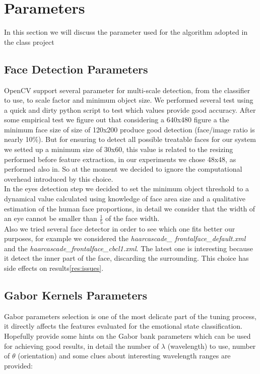 \section{Parameters}

In this section we will discuss the parameter used for the algorithm adopted in the class project

\subsection{Face Detection Parameters}

OpenCV support several parameter for multi-scale detection, from the classifier to use, to scale factor and minimum object size. We performed several test using a quick and dirty python script to test which values provide good accuracy. After some empirical test we figure out that considering a 640x480 figure a the minimum face size of size of 120x200 produce good detection (face/image ratio is nearly 10\%). But for ensuring to detect all possible treatable faces for our system we setted up a minimum size of 30x60, this value is related to the resizing performed before feature extraction, in our experiments we chose 48x48, as performed also in\cite{Littlewort04dynamicsof}. So at the moment we decided to ignore the computational overhead introduced by this choice. \\

In the eyes detection step we decided to set the minimum object threshold to a dynamical value calculated using knowledge of face area size and a qualitative estimation of the human face proportions, in detail we consider that the width of an eye cannot be smaller than $\frac{1}{5}$ of the face width.\\

Also we tried several face detector in order to see which one fits better our purposes, for example we considered the \emph{haarcascade\_ frontalface\_default.xml} and the \emph{haarcascade\_frontalface\_cbcl1.xml}. The latest one is interesting because it detect the inner part of the face, discarding the surrounding. This choice has side effects on results\ref{res:issues}.

\subsection{Gabor Kernels Parameters}

Gabor parameters selection is one of the most delicate part of the tuning process, it directly affects the features evaluated for the emotional state classification. Hopefully \cite{Littlewort04dynamicsof, Bartlett06fullyautomatic, Lades93distortioninvariant} provide some hints on  the Gabor bank parameters which can be used for achieving good results, in detail the number of $\lambda$ (wavelength) to use, number of $\theta$ (orientation) and some clues about interesting wavelength ranges are provided:


